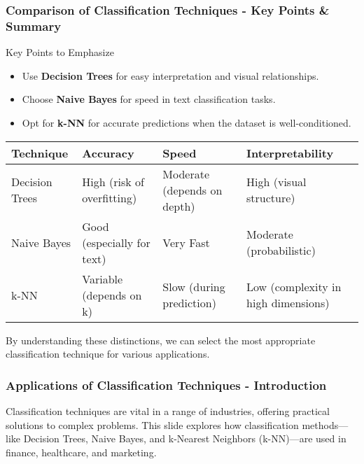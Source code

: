 \documentclass[aspectratio=169]{beamer}
\begin{document}
\begin{frame}[fragile]
    \frametitle{Comparison of Classification Techniques - Key Points & Summary}
    \begin{block}{Key Points to Emphasize}
        \begin{itemize}
            \item Use \textbf{Decision Trees} for easy interpretation and visual relationships.
            \item Choose \textbf{Naive Bayes} for speed in text classification tasks.
            \item Opt for \textbf{k-NN} for accurate predictions when the dataset is well-conditioned.
        \end{itemize}
    \end{block}
    
    \vspace{1em}
    \begin{tabular}{|l|l|l|l|}
        \hline
        \textbf{Technique} & \textbf{Accuracy} & \textbf{Speed} & \textbf{Interpretability} \\
        \hline
        Decision Trees & High (risk of overfitting) & Moderate (depends on depth) & High (visual structure) \\
        \hline
        Naive Bayes & Good (especially for text) & Very Fast & Moderate (probabilistic) \\
        \hline
        k-NN & Variable (depends on k) & Slow (during prediction) & Low (complexity in high dimensions) \\
        \hline
    \end{tabular}
    
    \vspace{1em}
    By understanding these distinctions, we can select the most appropriate classification technique for various applications.
\end{frame}

\begin{frame}[fragile]
    \frametitle{Applications of Classification Techniques - Introduction}
    Classification techniques are vital in a range of industries, offering practical solutions to complex problems. This slide explores how classification methods—like Decision Trees, Naive Bayes, and k-Nearest Neighbors (k-NN)—are used in finance, healthcare, and marketing.
\end{frame}
\end{document}
